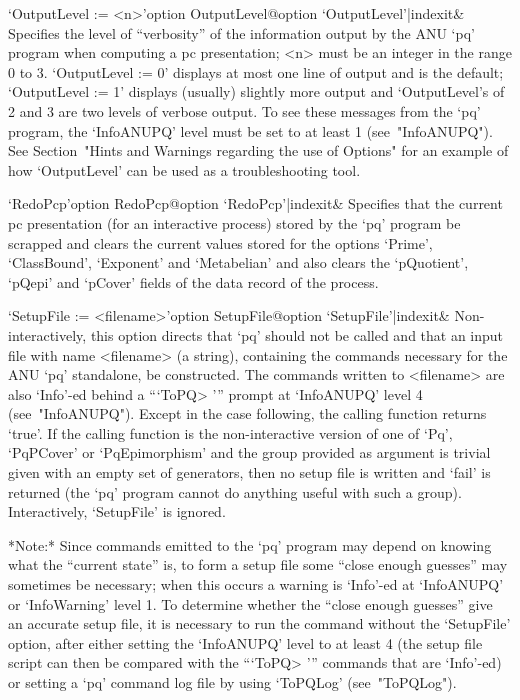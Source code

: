 \endlist

\>`OutputLevel := <n>'{option OutputLevel}@{option `OutputLevel'|indexit}&
Specifies the level of ``verbosity'' of the information output by the ANU
`pq' program when computing a pc presentation; <n> must be an integer  in
the range 0 to 3. `OutputLevel := 0' displays at most one line of  output
and is the default; `OutputLevel := 1' displays (usually)  slightly  more
output and `OutputLevel's of 2 and 3 are two levels of verbose output. To
see these messages from the `pq' program, the `InfoANUPQ' level  must  be
set to at least 1  (see~"InfoANUPQ").  See  Section~"Hints  and  Warnings
regarding the use of Options" for an example of how `OutputLevel' can  be
used as a troubleshooting tool.

\>`RedoPcp'{option RedoPcp}@{option `RedoPcp'|indexit}&
Specifies that the current pc presentation (for an  interactive  process)
stored by the `pq' program be scrapped  and  clears  the  current  values
stored for the options `Prime', `ClassBound', `Exponent' and `Metabelian'
and also clears the `pQuotient', `pQepi' and `pCover' fields of the  data
record of the process.

\>`SetupFile := <filename>'{option SetupFile}@{option `SetupFile'|indexit}&
Non-interactively, this option directs that `pq' should not be called and
that an input file  with  name  <filename>  (a  string),  containing  the
commands necessary for the  ANU  `pq'  standalone,  be  constructed.  The
commands written to <filename> are also `Info'-ed behind  a  ```ToPQ> '''
prompt at `InfoANUPQ' level  4  (see~"InfoANUPQ").  Except  in  the  case
following, the calling function returns `true'. If the  calling  function
is  the  non-interactive  version  of  one   of   `Pq',   `PqPCover'   or
`PqEpimorphism' and the group provided as argument is trivial given  with
an empty set of generators, then no setup file is written and  `fail'  is
returned (the `pq' program cannot do anything useful with such a  group).
Interactively, `SetupFile' is ignored.

*Note:*
Since commands emitted to the `pq' program may depend on knowing what the
``current state'' is, to form a setup file some ``close enough  guesses''
may sometimes be necessary; when this occurs a warning  is  `Info'-ed  at
`InfoANUPQ' or `InfoWarning' level 1. To determine  whether  the  ``close
enough guesses'' give an accurate setup file, it is necessary to run  the
command  without  the  `SetupFile'  option,  after  either  setting   the
`InfoANUPQ' level to at least 4  (the  setup  file  script  can  then  be
compared with the ```ToPQ> ''' commands that are `Info'-ed) or setting  a
`pq' command log file by using `ToPQLog' (see~"ToPQLog").

